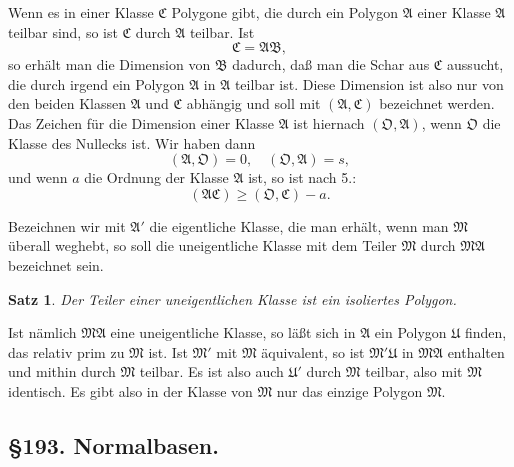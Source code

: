 \documentclass[12pt,a4paper]{article}
\newtheorem*{satz}{Satz}
\begin{document}
Wenn es in einer Klasse $\mathfrak{C}$ Polygone gibt, die durch ein Polygon $\mathfrak{A}$ einer Klasse $\mathfrak{A}$ teilbar sind, so ist $\mathfrak{C}$ durch $\mathfrak{A}$ teilbar. Ist
\[
\mathfrak{C} = \mathfrak{A}\mathfrak{B},
\]
so erhält man die Dimension von $\mathfrak{B}$ dadurch, daß man die Schar aus $\mathfrak{C}$ aussucht, die durch irgend ein Polygon $\mathfrak{A}$ in $\mathfrak{A}$ teilbar ist. Diese Dimension ist also nur von den beiden Klassen $\mathfrak{A}$ und $\mathfrak{C}$ abhängig und soll mit $(\mathfrak{A}, \mathfrak{C})$ bezeichnet werden. Das Zeichen für die Dimension einer Klasse $\mathfrak{A}$ ist hiernach $(\mathfrak{O}, \mathfrak{A})$, wenn $\mathfrak{O}$ die Klasse des Nullecks ist. Wir haben dann
\begin{equation}\label{eq:192-14}
(\mathfrak{A}, \mathfrak{O}) = 0, \quad (\mathfrak{O}, \mathfrak{A}) = s,
\end{equation}
und wenn $a$ die Ordnung der Klasse $\mathfrak{A}$ ist, so ist nach 5.:
\begin{equation}\label{eq:192-15}
(\mathfrak{A}\mathfrak{C}) \geq (\mathfrak{O}, \mathfrak{C}) - a.
\end{equation}

Bezeichnen wir mit $\mathfrak{A}'$ die eigentliche Klasse, die man erhält, wenn man $\mathfrak{M}$ überall weghebt, so soll die uneigentliche Klasse mit dem Teiler $\mathfrak{M}$ durch $\mathfrak{M}\mathfrak{A}$ bezeichnet sein.

\begin{satz}
Der Teiler einer uneigentlichen Klasse ist ein isoliertes Polygon.
\end{satz}

Ist nämlich $\mathfrak{M}\mathfrak{A}$ eine uneigentliche Klasse, so läßt sich in $\mathfrak{A}$ ein Polygon $\mathfrak{U}$ finden, das relativ prim zu $\mathfrak{M}$ ist. Ist $\mathfrak{M}'$ mit $\mathfrak{M}$ äquivalent, so ist $\mathfrak{M}'\mathfrak{U}$ in $\mathfrak{M}\mathfrak{A}$ enthalten und mithin durch $\mathfrak{M}$ teilbar. Es ist also auch $\mathfrak{U}'$ durch $\mathfrak{M}$ teilbar, also mit $\mathfrak{M}$ identisch. Es gibt also in der Klasse von $\mathfrak{M}$ nur das einzige Polygon $\mathfrak{M}$.

\subsection*{\S 193. Normalbasen.}
\end{document}
